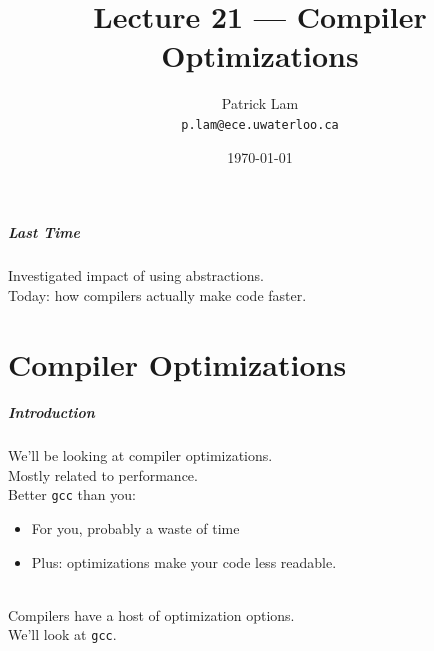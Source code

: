 

\title{Lecture 21 --- Compiler Optimizations }

\author{Patrick Lam \\ \small \texttt{p.lam@ece.uwaterloo.ca}}
\date{\today}




\begin{frame}
  \titlepage

 \end{frame}


\begin{frame}
  \frametitle{Last Time}
  
    Investigated impact of using abstractions.\\[1em]
    Today: how compilers actually make code faster.
  
\end{frame}

\part{Compiler Optimizations}
\frame{\partpage}

\begin{frame}
  \frametitle{Introduction}

  
    We'll be looking at compiler optimizations.\\[1em]
    Mostly related to performance.\\
    Better {\tt gcc} than you:
      \begin{itemize}
        \item For you, probably a waste of time
        \item Plus: optimizations make your code less readable.
      \end{itemize}
~\\

    Compilers have a host of optimization options.\\
     We'll look at {\tt gcc}.
  
\end{frame}

